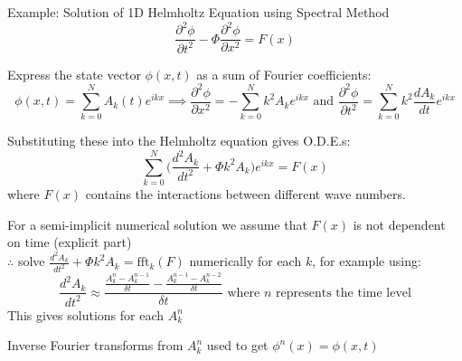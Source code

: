 \begin{slide}{Example: Solution of 1D Helmholtz Equation using Spectral Method}
\[
\frac{\partial^2 \phi}{\partial t^2} - \Phi \frac{\partial^2 \phi}{\partial x^2}
= F(x)
\]

\begin{list0}
\item Express the state vector $\phi(x,t)$ as a sum of Fourier coefficients:
\vspace{-4ex}\[
\phi(x,t) = \sum_{k=0}^N A_k(t) e^{ikx}
%
\implies \frac{\partial^2 \phi}{\partial x^2} = -\sum_{k=0}^N k^2 A_k e^{ikx}
\text{ and }
\frac{\partial^2 \phi}{\partial t^2} = \sum_{k=0}^N k^2 \frac{dA_k}{dt} e^{ikx}
\]\vspace{-4ex}
\item Substituting these into the Helmholtz equation gives O.D.E.s:
\vspace{-4ex}\[
\sum_{k=0}^N\biggl( \frac{d^2 A_k}{dt^2} + \Phi k^2 A_k\biggr) e^{ikx} = F(x)
\]
where $F(x)$ contains the interactions between different wave numbers.\\
\item For a semi-implicit numerical solution we assume that $F(x)$ is not dependent on time (explicit part)\\
$\therefore$ solve $\frac{d^2 A_k}{dt^2} + \Phi k^2 A_k = \text{fft}_k(F)$ numerically for each $k$, for example using:
\vspace{-4ex}\[
\frac{d^2 A_k}{dt^2} \approx
\frac
{\frac{A_k^n - A_k^{n-1}}{\delta t} - \frac{A_k^{n-1} - A_k^{n-2}}{\delta t}}
{\delta t}
\text{ where $n$ represents the time level}
\]
This gives solutions for each $A_k^n$
\item Inverse Fourier transforms from $A^n_k$ used to get $\phi^n(x) = \phi(x,t)$
\end{list0}
\end{slide}



